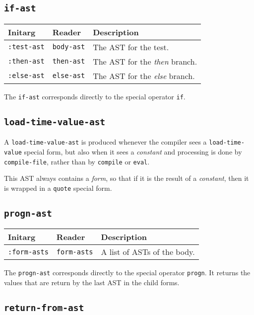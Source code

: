 \subsection{\texttt{if-ast}}
\label{if-ast}

\begin{tabular}{|l|l|l|}
\hline
Initarg & Reader & Description\\
\hline\hline
\texttt{:test-ast} & \texttt{body-ast} & The AST for the test.\\
\hline
\texttt{:then-ast} & \texttt{then-ast} & The AST for the \emph{then} branch.\\
\hline
\texttt{:else-ast} & \texttt{else-ast} & The AST for the \emph{else} branch.\\
\hline
\end{tabular}

The \texttt{if-ast} corresponds directly to the \cl{} special operator
\texttt{if}. 

\subsection{\texttt{load-time-value-ast}}
\label{load-time-value-ast}

A \texttt{load-time-value-ast} is produced whenever the compiler sees
a \texttt{load-time-value} special form, but also when it sees a
\emph{constant} and processing is done by \texttt{compile-file},
rather than by \texttt{compile} or \texttt{eval}.  

This AST always contains a \emph{form}, so that if it is the result of
a \emph{constant}, then it is wrapped in a \texttt{quote} special
form. 

\subsection{\texttt{progn-ast}}
\label{progn-ast}

\begin{tabular}{|l|l|l|}
\hline
Initarg & Reader & Description\\
\hline\hline
\texttt{:form-asts} & \texttt{form-asts} & A list of ASTs of the body.\\
\hline
\end{tabular}

The \texttt{progn-ast} corresponds directly to the \cl{} special
operator \texttt{progn}.  It returns the values that are return by the
last AST in the child forms.

\subsection{\texttt{return-from-ast}}
\label{return-from-ast}

